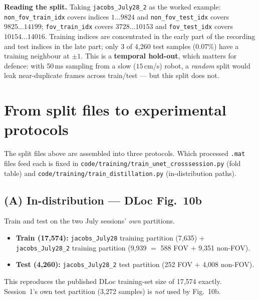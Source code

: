 \documentclass[11pt]{article}
\newcommand{\file}[1]{\texttt{#1}}
\begin{document}
\textbf{Reading the split.} Taking \file{jacobs\_July28\_2} as the worked example:
\file{non\_fov\_train\_idx} covers indices $1\ldots9824$ and
\file{non\_fov\_test\_idx} covers $9825\ldots14199$; \file{fov\_train\_idx} covers
$3728\ldots10153$ and \file{fov\_test\_idx} covers $10154\ldots14016$. Training
indices are concentrated in the early part of the recording and test indices in
the late part; only 3 of 4,260 test samples ($0.07\%$) have a training neighbour
at $\pm1$. This is a \textbf{temporal hold-out}, which matters for defence: with
50\,ms sampling from a slow ($15$\,cm/s) robot, a \emph{random} split would leak
near-duplicate frames across train/test --- but this split does not.

\section{From split files to experimental protocols}
The split files above are assembled into three protocols. Which processed
\file{.mat} files feed each is fixed in \file{code/training/train\_unet\_crosssession.py}
(fold table) and \file{code/training/train\_distillation.py} (in-distribution paths).

\subsection{(A) In-distribution --- DLoc Fig.\ 10b}
Train and test on the two July sessions' \emph{own} partitions.
\begin{itemize}[nosep,leftmargin=1.4em]
\item \textbf{Train (17{,}574):} \file{jacobs\_July28} training partition (7{,}635)
      $+$ \file{jacobs\_July28\_2} training partition (9{,}939 $=$ 588 FOV $+$ 9{,}351 non-FOV).
\item \textbf{Test (4{,}260):} \file{jacobs\_July28\_2} test partition (252 FOV $+$ 4{,}008 non-FOV).
\end{itemize}
This reproduces the published DLoc training-set size of 17{,}574 exactly.
Session~1's own test partition (3{,}272 samples) is \emph{not} used by Fig.\ 10b.

\end{document}
